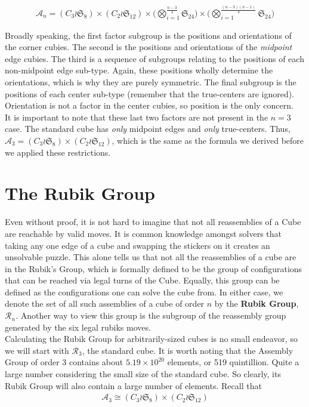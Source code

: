 \documentclass[10pt,letterpaper]{report}
\begin{document}
\begin{align*}
\mathcal{A}_n = (C_3 \wr \mathfrak{S}_8) \times (C_2 \wr \mathfrak{S}_{12}) \times \Big( \bigotimes_{i=1}^{\frac{n-3}{2}}\mathfrak{S}_{24} \Big) \times \Big( \bigotimes_{i=1}^{\frac{(n-3)(n-1)}{4}}\mathfrak{S}_{24} \Big)
\end{align*}

Broadly speaking, the first factor subgroup is the positions and orientations of the corner cubies.  The second is the positions and orientations of the \textit{midpoint} edge cubies.  The third is a sequence of subgroups relating to the positions of each non-midpoint edge sub-type.  Again, these positions wholly determine the orientations, which is why they are purely symmetric.  The final subgroup is the positions of each center sub-type (remember that the true-centers are ignored).  Orientation is not a factor in the center cubies, so position is the only concern. \\

It is important to note that these last two factors are not present in the $n=3$ case.  The standard cube has \textit{only} midpoint edges and \textit{only} true-centers.  Thus, $\mathcal{A}_3 = (C_3 \wr \mathfrak{S}_8) \times (C_2 \wr \mathfrak{S}_{12})$, which is the same as the formula we derived before we applied these restrictions.

\section{The Rubik Group}
Even without proof, it is not hard to imagine that not all reassemblies of a Cube are reachable by valid moves.  It is common knowledge amongst solvers that taking any one edge of a cube and swapping the stickers on it creates an unsolvable puzzle.  This alone tells us that not all the reassemblies of a cube are in the Rubik's Group, which is formally defined to be the group of configurations that can be reached via legal turns of the Cube.  Equally, this group can be defined as the configurations one can solve the cube from.  In either case, we denote the set of all such assemblies of a cube of order $n$ by the \textbf{Rubik Group}, $\mathcal{R}_n$.  Another way to view this group is the subgroup of the reassembly group generated by the six legal rubiks moves.  \\

Calculating the Rubik Group for arbitrarily-sized cubes is no small endeavor, so we will start with $\mathcal{R}_3$, the standard cube.  It is worth noting that the Assembly Group of order 3 contains about $5.19 \times 10^{20}$ elements, or 519 quintillion.  Quite a large number considering the small size of the standard cube.  So clearly, its Rubik Group will also contain a large number of elements.  Recall that \begin{align*}
\mathcal{A}_3 \cong (C_3 \wr \mathfrak{S}_8) \times (C_2 \wr \mathfrak{S}_{12})
\end{align*}
\end{document}
